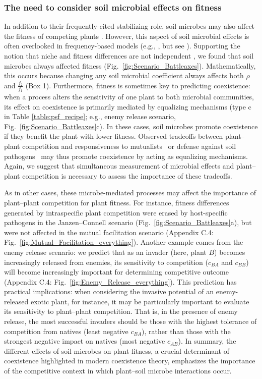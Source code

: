 \subsubsection*{The need to consider soil microbial effects on fitness}
In addition to their frequently-cited stabilizing role, soil microbes may also affect the fitness of competing plants \citep{Mordecai2011}.
However, this aspect of soil microbial effects is often overlooked in frequency-based models (e.g., \citealt{Bever1997}, but see \citealt{Eppinga2018}).
Supporting the notion that niche and fitness differences are not independent \citep{Letten2017, Barabas2018}, we found that soil microbes always affected fitness (Fig.~\ref{fig:Scenario_Battleaxes}). Mathematically, this occurs because changing any soil microbial coefficient always affects both $\rho$ and $\frac{f_{2}}{f_{1}}$ (Box 1).
Furthermore, fitness is sometimes key to predicting coexistence: when a process alters the sensitivity of one plant to both microbial communities, its effect on coexistence is primarily mediated by equalizing mechanisms (type c in Table \ref{table:psf_recipe}; e.g., enemy release scenario, Fig.~\ref{fig:Scenario_Battleaxes}c). In these cases, soil microbes promote coexistence if they benefit the plant with lower fitness.
Observed tradeoffs between plant--plant competition and responsiveness to mutualists~\citep{Grman2012} or defense against soil pathogens~\citep{Rasmann2011} may thus promote coexistence by acting as equalizing mechanisms. Again, we suggest that simultaneous measurement of microbial effects and plant--plant competition is necessary to assess the importance of these tradeoffs.
\par


As in other cases, these microbe-mediated processes may affect the importance of plant--plant competition for plant fitness. For instance, fitness differences generated by intraspecific plant competition were erased by host-specific pathogens in the Janzen--Connell scenario (Fig.~\ref{fig:Scenario_Battleaxes}a), but were not affected in the mutual facilitation scenario (Appendix C.4: Fig.~\ref{fig:Mutual_Facilitation_everything}).
Another example comes from the enemy release scenario: we predict that as an invader (here, plant $B$) becomes increasingly released from enemies, its sensitivity to competition ($c_{BA}$ and $c_{BB}$) will become increasingly important for determining competitive outcome (Appendix C.4: Fig.~\ref{fig:Enemy_Release_everything}).
This prediction has practical implications: when considering the invasive potential of an enemy-released exotic plant, for instance, it may be particularly important to evaluate its sensitivity to plant--plant competition. That is, in the presence of enemy release, the most successful invaders should be those with the highest tolerance of competition from natives (least negative $c_{BA}$), rather than those with the strongest negative impact on natives (most negative $c_{AB}$).
In summary, the different effects of soil microbes on plant fitness, a crucial determinant of coexistence highlighted in modern coexistence theory, emphasizes the importance of the competitive context in which plant--soil microbe interactions occur.
\par


